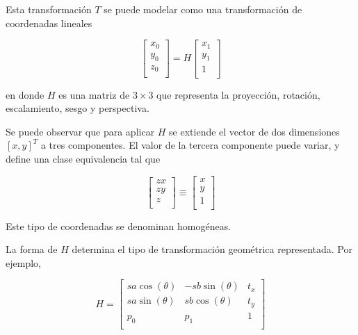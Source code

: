 \documentclass[a4paper,10pt]{article}
\begin{document}
Esta transformación $T$ se puede modelar como una transformación de coordenadas lineales

\begin{equation}
    \begin{bmatrix}
        x_{0} \\
        y_{0} \\
        z_{0} \\
    \end{bmatrix}
    = H
    \begin{bmatrix}
        x_{1} \\
        y_{1} \\
        1 \\
    \end{bmatrix}
\end{equation}

en donde $H$ es una matriz de $3 \times 3$ que representa la proyección, rotación, escalamiento, sesgo y perspectiva.

Se puede observar que para aplicar $H$ se extiende el vector de dos dimensiones $[x,y]^{T}$ a tres componentes. El valor de la
tercera componente puede variar, y define una clase equivalencia tal que

\begin{equation}
    \begin{bmatrix}
        zx \\
        zy \\
        z \\
    \end{bmatrix}
    \equiv
    \begin{bmatrix}
        x \\
        y \\
        1 \\
    \end{bmatrix}
\end{equation}

Este tipo de coordenadas se denominan homogéneas.

La forma de $H$ determina el tipo de transformación geométrica representada. Por ejemplo,

\begin{equation}
    H =
    \begin{bmatrix}
        sa\cos(\theta) & -sb\sin(\theta) & t_{x}\\
        sa\sin(\theta) & sb\cos(\theta) & t_{y} \\
        p_{0}          & p_{1}          & 1     \\
    \end{bmatrix}
\end{equation}
\end{document}
